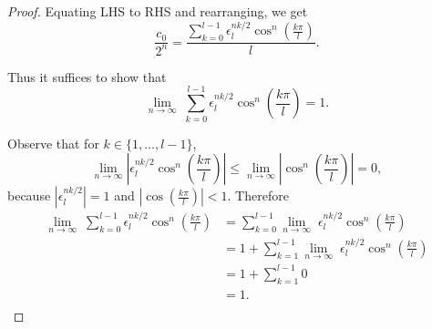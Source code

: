 \documentclass{article}
\begin{document}
\begin{enumerate}[label={\bf Q\arabic*:}]
\begin{proof}
      Equating LHS to RHS and rearranging, we get
      \[\frac{c_0}{2^n}
      =\frac{\sum_{k=0}^{l-1}
      \epsilon_l^{nk/2}\cos^n\left(\frac{k\pi}{l}\right)}{l}.\]

      Thus it suffices to show that 
      \[\lim_{n\rightarrow\infty}\; \sum_{k=0}^{l-1}
      \epsilon_l^{nk/2}\cos^n\left(\frac{k\pi}{l}\right) =1.\]

      Observe that for $k\in\{1,\ldots,l-1\}$,
      \[\lim_{n\rightarrow\infty}
      \left|\epsilon_l^{nk/2} \cos^n\left(\frac{k\pi}{l}\right)\right|
      \leq\lim_{n\rightarrow\infty}
      \left|\cos^n\left(\frac{k\pi}{l}\right)\right|=0,\]
      because $|\epsilon_l^{nk/2}|=1$ and
      $\left|\cos\left(\frac{k\pi}{l}\right)\right|<1$. Therefore
      \begin{align*}
        \lim_{n\rightarrow\infty}\; \sum_{k=0}^{l-1}
          \epsilon_l^{nk/2}\cos^n\left(\frac{k\pi}{l}\right)
        &=\sum_{k=0}^{l-1} \lim_{n\rightarrow\infty}\;
          \epsilon_l^{nk/2}\cos^n\left(\frac{k\pi}{l}\right)\\
        &=1+\sum_{k=1}^{l-1} \lim_{n\rightarrow\infty}\;
          \epsilon_l^{nk/2}\cos^n\left(\frac{k\pi}{l}\right)\\
        &=1+\sum_{k=1}^{l-1}0\\
        &=1.\\
      \end{align*}
    \end{proof}
\end{enumerate}
\end{document}
